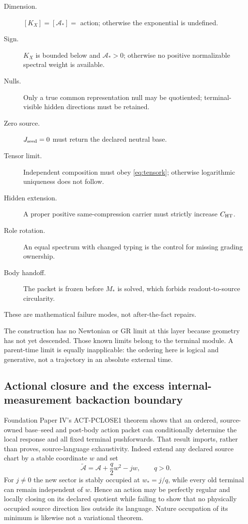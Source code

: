 \documentclass[11pt,a4paper]{article}
\theoremstyle{remark}
\begin{document}
\begin{description}
 \item[Dimension.] $[K_X]=[\mathcal A_*]=$ action; otherwise the
 exponential is undefined.
 \item[Sign.] $K_X$ is bounded below and $\mathcal A_*>0$; otherwise no
 positive normalizable spectral weight is available.
 \item[Nulls.] Only a true common representation null may be quotiented;
 terminal-visible hidden directions must be retained.
 \item[Zero source.] $J_{\rm seed}=0$ must return the declared neutral base.
 \item[Tensor limit.] Independent composition must obey
 \eqref{eq:tensork}; otherwise logarithmic uniqueness does not follow.
 \item[Hidden extension.] A proper positive same-compression carrier must
 strictly increase $C_{\rm HT}$.
 \item[Role rotation.] An equal spectrum with changed typing is the control
 for missing grading ownership.
 \item[Body handoff.] The packet is frozen before $M_*$ is solved, which
 forbids readout-to-source circularity.
\end{description}
These are mathematical failure modes, not after-the-fact repairs.

The construction has no Newtonian or GR limit at this layer because geometry
has not yet descended.  Those known limits belong to the terminal module.  A
parent-time limit is equally inapplicable: the ordering here is logical and
generative, not a trajectory in an absolute external time.

\subsection*{Actional closure and the excess internal-measurement backaction boundary}
Foundation Paper IV's ACT-PCLOSE1 theorem shows that an ordered, source-owned
base--seed and post-body action packet can conditionally determine the local
response and all fixed terminal pushforwards.  That result imports, rather
than proves, source-language exhaustivity.  Indeed extend any declared source
chart by a stable coordinate $w$ and set
\[
 \widetilde{\mathcal A}=\mathcal A+\frac{q}{2}w^2-jw,
 \qquad q>0.
\]
For $j\ne0$ the new sector is stably occupied at $w_*=j/q$, while every old
terminal can remain independent of $w$.  Hence an action may be perfectly
regular and locally closing on its declared quotient while failing to show
that no physically occupied source direction lies outside its language.
Nature occupation of its minimum is likewise not a variational theorem.
\end{document}
